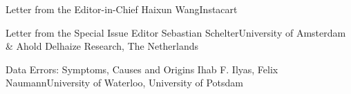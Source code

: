 \documentclass[11pt]{article}
\begin{document}


\begin{bulletin}


%
%

\begin{lettersection}


\begin{letter}{Letter from the Editor-in-Chief}
{Haixun Wang}{Instacart}

\end{letter}
%
\newpage
%
%
\begin{letter}{Letter from the Special Issue Editor} %
{Sebastian Schelter}{University of Amsterdam \& Ahold Delhaize Research, The Netherlands}

\end{letter}

\end{lettersection}


\begin{opinionsection}
\begin{opinion}{Data Errors:  Symptoms,  Causes and  Origins}
{Ihab F. Ilyas, Felix  Naumann}{University  of  Waterloo, University of Potsdam}

\end{opinion}
\end{opinionsection}


\end{bulletin}
\end{document}
